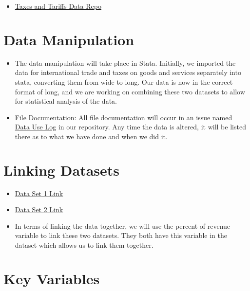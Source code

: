 \documentclass[12pt]{article}
\begin{document}
\noindent
\begin{itemize}

    \item \href{https://github.com/ecn310/course-project-taxes-tariffs/issues/6}{Taxes and Tariffs Data Repo}
\end{itemize}


\section{Data Manipulation}
\label{sec:data}

\begin{itemize}
    \item The data manipulation will take place in Stata. Initially, we imported the data for international trade and taxes on goods and services separately into stata, converting them from wide to long. Our data is now in the correct format of long, and we are working on combining these two datasets to allow for statistical analysis of the data.
    \item File Documentation: All file documentation will occur in an issue named \href{https://github.com/ecn310/course-project-taxes-tariffs/issues/6}{Data Use Log} in our repository. Any time the data is altered, it will be listed there as to what we have done and when we did it.
\end{itemize}


\section{Linking Datasets}
\label{sec:discussion}

\begin{itemize}
    \item \href{https://wits.worldbank.org/CountryProfile/en/Country/BY-COUNTRY/StartYear/1988/EndYear/2022/Indicator/GC-TAX-INTT-RV-ZS}{Data Set 1 Link}

 \item \href{https://wits.worldbank.org/CountryProfile/en/country/by-country/startyear/LTST/endyear/LTST/indicator/GC-TAX-GSRV-RV-ZS}{Data Set 2 Link}
 \item In terms of linking the data together, we will use the percent of revenue variable to link these two datasets. They both have this variable in the dataset which allows us to link them together. 
\end{itemize}

\section{Key Variables}
\label{sec:result}
\end{document}
